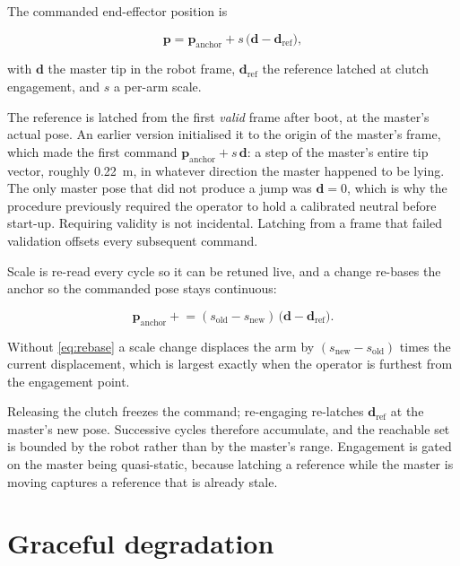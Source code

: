 The commanded end-effector position is

\begin{equation}
  \mathbf{p} = \mathbf{p}_{\text{anchor}} + s\,\bigl(\mathbf{d} - \mathbf{d}_{\text{ref}}\bigr),
  \label{eq:anchor}
\end{equation}

with $\mathbf{d}$ the master tip in the robot frame, $\mathbf{d}_{\text{ref}}$
the reference latched at clutch engagement, and $s$ a per-arm scale.

The reference is latched from the first \emph{valid} frame after boot, at the
master's actual pose. An earlier version initialised it to the origin of the
master's frame, which made the first command $\mathbf{p}_{\text{anchor}} +
s\,\mathbf{d}$: a step of the master's entire tip vector, roughly
\SI{0.22}{\metre}, in whatever direction the master happened to be lying. The
only master pose that did not produce a jump was $\mathbf{d} = 0$, which is
why the procedure previously required the operator to hold a calibrated
neutral before start-up. Requiring validity is not incidental. Latching from a
frame that failed validation offsets every subsequent command.

Scale is re-read every cycle so it can be retuned live, and a change re-bases
the anchor so the commanded pose stays continuous:

\begin{equation}
  \mathbf{p}_{\text{anchor}} \mathrel{+}= (s_{\text{old}} - s_{\text{new}})\,
  \bigl(\mathbf{d} - \mathbf{d}_{\text{ref}}\bigr).
  \label{eq:rebase}
\end{equation}

Without \cref{eq:rebase} a scale change displaces the arm by
$(s_{\text{new}} - s_{\text{old}})$ times the current displacement, which is
largest exactly when the operator is furthest from the engagement point.

Releasing the clutch freezes the command; re-engaging re-latches
$\mathbf{d}_{\text{ref}}$ at the master's new pose. Successive cycles
therefore accumulate, and the reachable set is bounded by the robot rather
than by the master's range. Engagement is gated on the master being
quasi-static, because latching a reference while the master is moving captures
a reference that is already stale.

\section{Graceful degradation}

